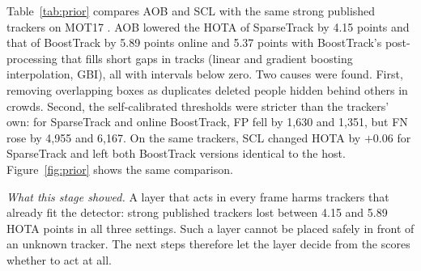 \documentclass[pdflatex,sn-mathphys-num,iicol]{sn-jnl}
\newcommand{\scl}{SCL}
\newcommand{\aob}{AOB}
\begin{document}
Table~\ref{tab:prior} compares \aob{} and \scl{} with the same strong
published trackers on MOT17 \cite{milan2016mot16}. \aob{} lowered the HOTA of
SparseTrack by 4.15 points and that of BoostTrack by 5.89 points online and
5.37 points with BoostTrack's post-processing that fills short gaps in
tracks (linear and gradient boosting interpolation, GBI), all with
intervals below zero. Two causes
were found. First, removing overlapping boxes as duplicates deleted people
hidden behind others in crowds. Second, the self-calibrated thresholds were
stricter than the trackers' own: for SparseTrack and online BoostTrack, FP
fell by 1,630 and 1,351, but FN rose by 4,955 and 6,167. On the same trackers, \scl{} changed HOTA by $+0.06$ for SparseTrack
and left both BoostTrack versions identical to the host.
Figure~\ref{fig:prior} shows the same comparison.

\emph{What this stage showed.} A layer that acts in every frame harms
trackers that already fit the detector: strong published trackers lost
between 4.15 and 5.89 HOTA points in all three settings. Such a layer cannot
be placed safely in front of an unknown tracker. The next steps therefore let
the layer decide from the scores whether to act at all.
\end{document}
